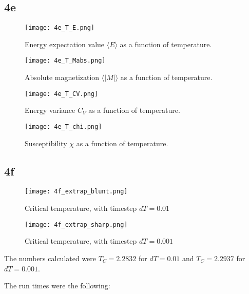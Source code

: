 \documentclass[10pt,showpacs,preprintnumbers,footinbib,amsmath,amssymb,aps,prl,twocolumn,groupedaddress,superscriptaddress,showkeys]{revtex4-1}
\begin{document}
\subsection*{4e}

\begin{figure}
	\centering
	\texttt{[image: 4e\_T\_E.png]}
	\caption{Energy expectation value $\langle E \rangle$ as a function of temperature.}
	\label{fig:4e_Energy}
\end{figure}

\begin{figure}
	\centering
	\texttt{[image: 4e\_T\_Mabs.png]}
	\caption{Absolute magnetization $\langle |M| \rangle$ as a function of temperature.}
	\label{fig:4e_Mabs}
\end{figure}

\begin{figure}
	\centering
	\texttt{[image: 4e\_T\_CV.png]}
	\caption{Energy variance $C_V$ as a function of temperature.}
	\label{fig:4e_CV}
\end{figure}

\begin{figure}
	\centering
	\texttt{[image: 4e\_T\_chi.png]}
	\caption{Susceptibility $\chi$ as a function of temperature.}
	\label{fig:4e_chi}
\end{figure}


\subsection*{4f}

\begin{figure}
	\centering
	\texttt{[image: 4f\_extrap\_blunt.png]}
	\caption{Critical temperature, with timestep $dT = 0.01$}
	\label{fig:4f_blunt}
\end{figure}

\begin{figure}
	\centering
	\texttt{[image: 4f\_extrap\_sharp.png]}
	\caption{Critical temperature, with timestep $dT = 0.001$}
	\label{fig:4e_chi}
\end{figure}


The numbers calculated were $T_C = 2.2832$ for $dT = 0.01$ and $T_C = 2.2937$ for $dT = 0.001$.

The run times were the following:
\end{document}
